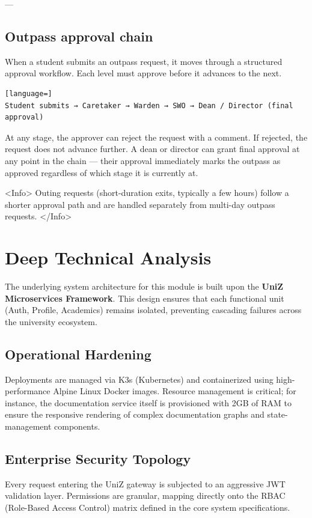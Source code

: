 \begin{tcolorbox}[colback=gray!5,colframe=primary,title=Documentation Note]
\begin{tcolorbox}[colback=gray!5,colframe=primary,title=Documentation Note]
\end{tcolorbox}


---

\subsection{Outpass approval chain}

When a student submits an outpass request, it moves through a structured approval workflow. Each level must approve before it advances to the next.

\begin{lstlisting}[language=]
Student submits → Caretaker → Warden → SWO → Dean / Director (final approval)

\end{lstlisting}

At any stage, the approver can reject the request with a comment. If rejected, the request does not advance further. A dean or director can grant final approval at any point in the chain — their approval immediately marks the outpass as approved regardless of which stage it is currently at.

<Info>
  Outing requests (short-duration exits, typically a few hours) follow a shorter
  approval path and are handled separately from multi-day outpass requests.
</Info>


\section{Deep Technical Analysis}
The underlying system architecture for this module is built upon the \textbf{UniZ Microservices Framework}. 
This design ensures that each functional unit (Auth, Profile, Academics) remains isolated, preventing cascading failures across the university ecosystem.

\subsection{Operational Hardening}
Deployments are managed via K3s (Kubernetes) and containerized using high-performance Alpine Linux Docker images. 
Resource management is critical; for instance, the documentation service itself is provisioned with 2GB of RAM to ensure the responsive rendering of complex documentation graphs and state-management components.

\subsection{Enterprise Security Topology}
Every request entering the UniZ gateway is subjected to an aggressive JWT validation layer. 
Permissions are granular, mapping directly onto the RBAC (Role-Based Access Control) matrix defined in the core system specifications.


\end{tcolorbox}
